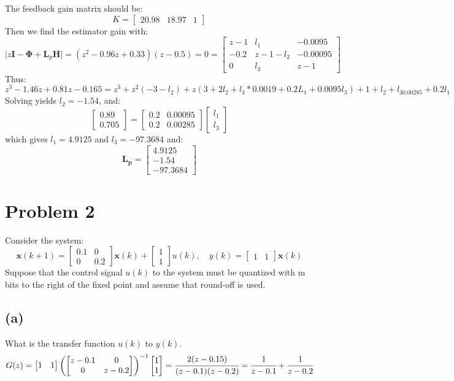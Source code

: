 \documentclass{article}
\begin{document}
The feedback gain matrix should be:
\[K=\begin{bmatrix}20.98&18.97&1\end{bmatrix}\]
Then we find the estimator gain with:
\[\lvert z\pmb{I}-\pmb{\Phi}+\pmb{L}_p\pmb{H}\rvert=(z^2-0.96z+0.33)(z-0.5)=0=\begin{bmatrix}z-1&l_1&-0.0095\\-0.2&z-1-l_2&-0.00095\\0&l_3&z-1\end{bmatrix}\]
Thus:
\[z^3-1.46z+0.81z-0.165=z^3+z^2(-3-l_2)+z(3+2l_2+l_3*0.0019+0.2L_1+0.0095l_3)+1+l_2+l_30.00285+0.2l_1\]
Solving yields $l_2=-1.54$, and:
\[\begin{bmatrix}0.89\\0.705\end{bmatrix}=\begin{bmatrix}0.2&0.00095\\0.2&0.00285\end{bmatrix}\begin{bmatrix}l_1\\l_3\end{bmatrix}\]
which gives $l_1=4.9125$ and $l_3=-97.3684$ and:
\[\pmb{L_p}=\begin{bmatrix}4.9125\\-1.54\\-97.3684\end{bmatrix}\]

\section*{Problem 2}
Consider the system:
\[\pmb{x}(k+1)=\begin{bmatrix}0.1&0\\0&0.2\end{bmatrix}\pmb{x}(k)+\begin{bmatrix}1\\1\end{bmatrix}u(k),\quad y(k)=\begin{bmatrix}1&1\end{bmatrix}\pmb{x}(k)\]
Suppose that the control signal $u(k)$ to the system must be quantized with m bits to the right of the fixed point and assume that round-off is used.\\
\subsection*{(a)}
What is the transfer function $u(k)$ to $y(k)$.
\[G(z)=\begin{bmatrix}1&1\end{bmatrix}\left (\begin{bmatrix}z-0.1&0\\0&z-0.2\end{bmatrix}\right )^{-1}\begin{bmatrix}1\\1\end{bmatrix}=\cfrac{2(z-0.15)}{(z-0.1)(z-0.2)}=\cfrac{1}{z-0.1}+\cfrac{1}{z-0.2}\]
\end{document}
